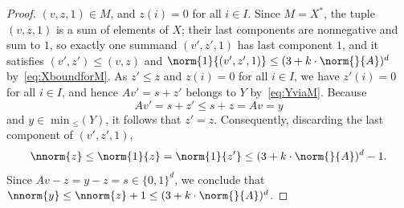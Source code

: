 \begin{proof}
	$(v,z,1)\in M$,
and $z(i)=0$ for all $i\in I$.
	Since $M=X^*$, the tuple $(v,z,1)$ is a sum of elements of $X$;
	their last components are nonnegative and sum to $1$, so exactly
	one summand $(v',z',1)$ has last component $1$, and it satisfies
	$(v',z')\leq (v,z)$ and
	$\norm{1}{(v',z',1)}\leq (3+k\cdot\norm{}{A})^d$
	by~\eqref{eq:XboundforM}.
	As $z'\leq z$ and $z(i)=0$ for all $i\in I$, we have $z'(i)=0$ for
	all $i\in I$, and hence $Av'=s+z'$ belongs to $Y$
	by~\eqref{eq:YviaM}.
	Because 
	\[Av'=s+z'\leq s+z=Av=y\] and $y\in \min{}_{\leq}(Y)$, it
	follows that $z'=z$. 
	Consequently, discarding the last component of $(v',z',1)$,
	\[\nnorm{z}\leq\norm{1}{z}=\norm{1}{z'}\leq (3+k\cdot\norm{}{A})^d-1.\]
	Since $Av-z=y-z=s\in\{0,1\}^d$,
	we conclude that $\nnorm{y}\leq\nnorm{z}+1\leq
	(3+k\cdot\norm{}{A})^d$.
\end{proof}

